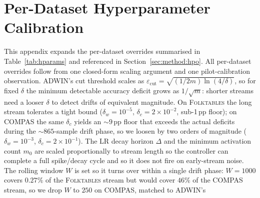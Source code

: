 \documentclass[sigconf,anonymous,review]{acmart}
\begin{document}
\section{Per-Dataset Hyperparameter Calibration}
\label{app:hpo}
This appendix expands the per-dataset overrides summarised in Table~\ref{tab:hparams} and referenced in Section~\ref{sec:method:hpo}.
All per-dataset overrides follow from one closed-form scaling argument and one pilot-calibration observation. ADWIN's cut threshold scales as
$\varepsilon_{\mathrm{cut}} = \sqrt{(1/2m)\ln(4/\delta)}$, so for fixed $\delta$ the minimum detectable accuracy deficit grows as $1/\sqrt{m}$: shorter
streams need a looser $\delta$ to detect drifts of equivalent magnitude. On \textsc{Folktables} the long stream tolerates a tight bound ($\delta_w{=}10^{-5}$,
$\delta_c{=}2{\times}10^{-2}$, sub-1\,pp floor); on \textsc{COMPAS} the same $\delta_c$ yields an $\sim$$9$\,pp floor that exceeds the actual deficits during the
$\sim$$865$-sample drift phase, so we loosen by two orders of magnitude ($\delta_w{=}10^{-3}$, $\delta_c{=}2{\times}10^{-1}$). The LR decay horizon $\Delta$
and the minimum activation count $m_0$ are scaled proportionally to stream length so the controller can complete a full spike/decay cycle and so it
does not fire on early-stream noise. The rolling window $W$ is set so it turns over within a single drift phase: $W=1000$ covers $0.27\%$ of the
\textsc{Folktables} stream but would cover $46\%$ of the \textsc{COMPAS} stream, so we drop $W$ to $250$ on \textsc{COMPAS}, matched to ADWIN's
\end{document}
